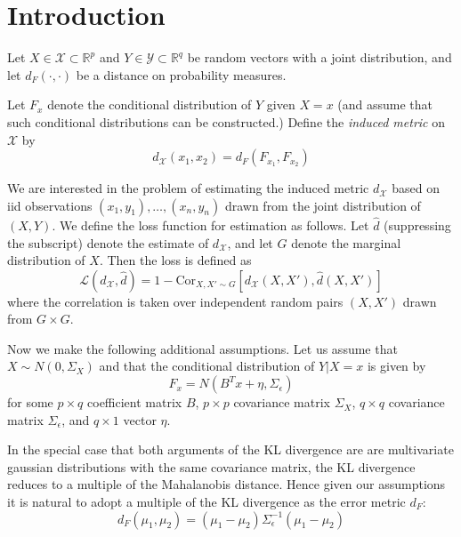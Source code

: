 \documentclass[12pt]{article}
\begin{document}
\maketitle

\newcommand{\tr}{\text{tr}}
\newcommand{\E}{\textbf{E}}
\newcommand{\diag}{\text{diag}}
\newcommand{\argmax}{\text{argmax}}
\newcommand{\Cov}{\text{Cov}}
\newcommand{\Cor}{\text{Cor}}
\newcommand{\Var}{\text{Var}}
\newcommand{\argmin}{\text{argmin}}
\newcommand{\Vol}{\text{Vol}}
\newcommand{\comm}[1]{}


\section{Introduction}

Let $X \in \mathcal{X} \subset \mathbb{R}^p$ and $Y \in \mathcal{Y} \subset \mathbb{R}^q$ be random vectors with
a joint distribution, and let $d_F(\cdot, \cdot)$ be a distance on
probability measures.

Let $F_x$ denote the conditional distribution of $Y$ given $X=x$ (and
assume that such conditional distributions can be constructed.)
Define the \emph{induced metric} on $\mathcal{X}$ by
\[
d_\mathcal{X}(x_1, x_2) = d_F(F_{x_1}, F_{x_2})
\]

We are interested in the problem of estimating the induced metric
$d_{\mathcal{X}}$ based on iid observations $(x_1,y_1),\hdots, (x_n,
y_n)$ drawn from the joint distribution of $(X, Y)$.  We define the
loss function for estimation as follows. Let $\hat{d}$ (suppressing
the subscript) denote the estimate of $d_{\mathcal{X}}$, and let
$G$ denote the marginal distribution of $X$. Then the loss
is defined as
\[
\mathcal{L}(d_\mathcal{X}, \hat{d}) 
= 1 - \Cor_{X, X' \sim G}[d_\mathcal{X}(X, X'), \hat{d}(X, X')]
\]
where the correlation is taken over independent random pairs $(X, X')$
drawn from $G \times G$.

Now we make the following additional assumptions.  Let us assume that
$X \sim N(0, \Sigma_X)$ and that the conditional distribution of
$Y|X=x$ is given by
\[
F_x =  N(B^T x + \eta, \Sigma_\epsilon)
\]
for some $p \times q$ coefficient matrix $B$, $p \times p$ covariance
matrix $\Sigma_X$, $q \times q$ covariance matrix $\Sigma_\epsilon$,
and $q \times 1$ vector $\eta$.

In the special case that both arguments of the KL divergence are are
multivariate gaussian distributions with the same covariance matrix,
the KL divergence reduces to a multiple of the Mahalanobis distance.
Hence given our assumptions it is natural to adopt a multiple of the
KL divergence as the error metric $d_F$:
\[
d_F(\mu_1, \mu_2) = (\mu_1-\mu_2)\Sigma_\epsilon^{-1}(\mu_1 - \mu_2)
\]
\end{document}
